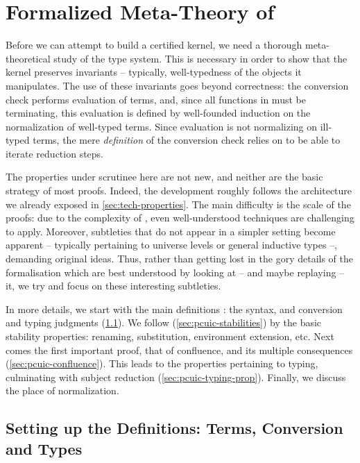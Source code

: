 
\chapter{Formalized Meta-Theory of }
\label{chap:metacoq-general}

\margintoc

Before we can attempt to build a certified kernel, we need a thorough meta-theoretical study
of the type system. This is necessary in order to show that the
kernel preserves invariants – typically, well-typedness of the objects it manipulates.
The use of these invariants goes beyond correctness:
the conversion check performs evaluation of terms, and, since all functions in 
must be terminating,
this evaluation is defined by well-founded induction on the normalization of well-typed terms.
Since evaluation is not normalizing on ill-typed terms, the mere \emph{definition} of the
conversion check relies on  to be able to iterate reduction steps.

The properties under scrutinee here are not new,
and neither are the basic strategy of most proofs.
Indeed, the development roughly follows the architecture we already exposed in
\cref{sec:tech-properties}. The main difficulty is the scale of the proofs: due to the
complexity of , even well-understood techniques are challenging to apply.
Moreover, subtleties that do not appear in a simpler setting become apparent –
typically pertaining to universe levels or general inductive types –,
demanding original ideas. Thus, rather than getting lost in
the gory details of the formalisation which are best understood by looking at
– and maybe replaying – it, we try and focus on these interesting subtleties.

In more details, we start with the main definitions : the syntax, and conversion and typing
judgments (\cref{sec:pcuic-defs}). We follow (\cref{sec:pcuic-stabilities}) by the basic
stability properties: renaming, substitution, environment extension, etc.
Next comes the first important proof, that of confluence, and its multiple consequences
(\cref{sec:pcuic-confluence}). This leads to the properties pertaining to typing, culminating
with subject reduction (\cref{sec:pcuic-typing-prop}).
Finally, we discuss the place of normalization.

\section[Terms, Conversion and Types]{Setting up the Definitions: Terms, Conversion and Types}
\label{sec:pcuic-defs}


